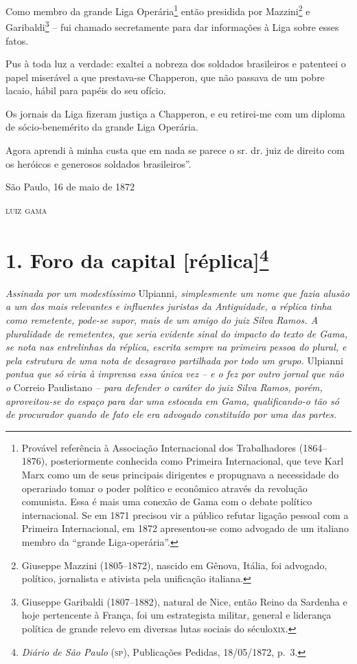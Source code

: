 Como membro da grande Liga Operária\footnote{ Provável referência à
  Associação Internacional dos Trabalhadores (1864--1876), posteriormente
  conhecida como Primeira Internacional, que teve Karl Marx como um de
  seus principais dirigentes e propugnava a necessidade do operariado
  tomar o poder político e econômico através da revolução comunista.
  Essa é mais uma conexão de Gama com o debate político internacional.
  Se em 1871 precisou vir a público refutar ligação pessoal com a
  Primeira Internacional, em 1872 apresentou-se como advogado de um
  italiano membro da ``grande Liga-operária''.} então presidida por
Mazzini\footnote{ Giuseppe Mazzini (1805--1872), nascido em Gênova,
  Itália, foi advogado, político, jornalista e ativista pela unificação
  italiana.} e Garibaldi\footnote{ Giuseppe Garibaldi (1807--1882),
  natural de Nice, então Reino da Sardenha e hoje pertencente à França,
  foi um estrategista militar, general e liderança política de grande
  relevo em diversas lutas sociais do século\textsc{xix}.} -- fui chamado
secretamente para dar informações à Liga sobre esses fatos.

Pus à toda luz a verdade: exaltei a nobreza dos soldados brasileiros e
patenteei o papel miserável a que prestava-se Chapperon, que não passava
de um pobre lacaio, hábil para papéis do seu ofício.

Os jornais da Liga fizeram justiça a Chapperon, e eu retirei-me com um
diploma de sócio-benemérito da grande Liga Operária.

Agora aprendi à minha custa que em nada se parece o sr. dr. juiz de
direito com os heróicos e generosos soldados brasileiros''.

\begin{flushright}
São Paulo, 16 de maio de 1872

\textsc{luiz gama}
\end{flushright}

\chapter{1. Foro da capital {[}réplica{]}\footnote{\emph{Diário de São Paulo} (\textsc{sp}), Publicações Pedidas,
  18/05/1872, p.~3.}} %

\begin{didascalia}
\emph{Assinada por um modestíssimo} Ulpianni\emph{, simplesmente um nome
que fazia alusão a um dos mais relevantes e influentes juristas da
Antiguidade, a réplica tinha como remetente, pode-se supor, mais de um
amigo do juiz Silva Ramos. A pluralidade de remetentes, que seria
evidente sinal do impacto do texto de Gama, se nota nas entrelinhas da
réplica, escrita sempre na primeira pessoa do plural, e pela estrutura
de uma nota de desagravo partilhada por todo um grupo.} Ulpianni
\emph{pontua que só viria à imprensa essa única vez -- e o fez por outro
jornal que não o} Correio Paulistano \emph{-- para defender o caráter do
juiz Silva Ramos, porém, aproveitou-se do espaço para dar uma estocada
em Gama, qualificando-o tão só de procurador quando de fato ele era
advogado constituído por uma das partes.}
\end{didascalia}


